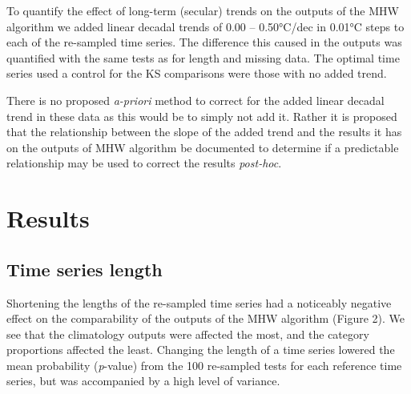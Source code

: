\documentclass[utf8]{frontiersSCNS} %
\begin{document}
To quantify the effect of long-term (secular) trends on the outputs of
the MHW algorithm we added linear decadal trends of 0.00 -- 0.50°C/dec
in 0.01°C steps to each of the re-sampled time series. The difference
this caused in the outputs was quantified with the same tests as for
length and missing data. The optimal time series used a control for the
KS comparisons were those with no added trend.

There is no proposed \emph{a-priori} method to correct for the added
linear decadal trend in these data as this would be to simply not add
it. Rather it is proposed that the relationship between the slope of the
added trend and the results it has on the outputs of MHW algorithm be
documented to determine if a predictable relationship may be used to
correct the results \emph{post-hoc}.

\hypertarget{results}{%
\section{Results}\label{results}}

\hypertarget{time-series-length}{%
\subsection{Time series length}\label{time-series-length}}

Shortening the lengths of the re-sampled time series had a noticeably
negative effect on the comparability of the outputs of the MHW algorithm
(Figure 2). We see that the climatology outputs were affected the most,
and the category proportions affected the least. Changing the length of
a time series lowered the mean probability (\emph{p}-value) from the 100
re-sampled tests for each reference time series, but was accompanied by
a high level of variance.
\end{document}
